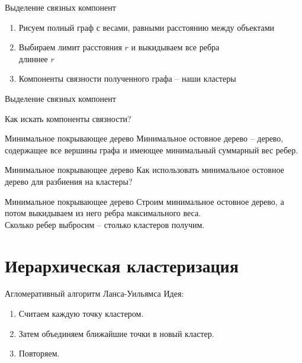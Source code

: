 \documentclass[10pt]{beamer}
\begin{document}
\begin{frame}{Выделение связных компонент}
	\begin{enumerate}
		\item Рисуем полный граф с весами, равными расстоянию между объектами
		\item Выбираем лимит расстояния $r$ и выкидываем все ребра\\ длиннее $r$
		\item Компоненты связности полученного графа -- наши кластеры
	\end{enumerate}
\end{frame}

\begin{frame}{Выделение связных компонент}
  \begin{center}
    Как искать \alert{компоненты связности}?
  \end{center}
\end{frame}

\begin{frame}{Минимальное покрывающее дерево}
	Минимальное остовное дерево -- дерево, содержащее все вершины графа и имеющее минимальный суммарный вес ребер.\\
\end{frame}

\begin{frame}{Минимальное покрывающее дерево}
  Как использовать минимальное остовное дерево для разбиения на кластеры?
\end{frame}

\begin{frame}{Минимальное покрывающее дерево}
	Строим минимальное остовное дерево, а потом выкидываем из него ребра максимального веса.\\
	\bigbreak
	Сколько ребер выбросим -- столько кластеров получим.
\end{frame}

\section{Иерархическая кластеризация}

\begin{frame}{Агломеративный алгоритм Ланса-Уильямса}
	\alert{Идея}:\\
	\begin{enumerate}
		\item Считаем каждую точку кластером. 
		\item Затем объединяем ближайшие точки в новый кластер. 
		\item Повторяем.
	\end{enumerate}
\end{frame}
\end{document}
